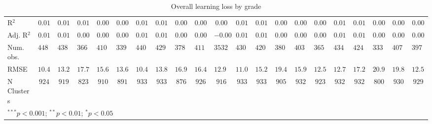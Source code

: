 \begin{table}
\begin{center}
\begin{tabular}{l c c c c c c c c c c c c c c c c c c c c}
\hline
R$^2$                     & $0.01$        & $0.01$        & $0.01$        & $0.00$        & $0.00$       & $0.01$        & $0.01$        & $0.00$        & $0.00$        & $0.00$       & $0.01$        & $0.01$        & $0.00$        & $0.00$        & $0.00$       & $0.01$        & $0.01$        & $0.00$        & $0.00$        & $0.00$       \\
Adj. R$^2$                & $0.01$        & $0.01$        & $0.00$        & $0.00$        & $0.00$       & $0.01$        & $0.01$        & $0.00$        & $0.00$        & $-0.00$      & $0.01$        & $0.01$        & $0.00$        & $0.00$        & $0.00$       & $0.01$        & $0.01$        & $0.00$        & $0.00$        & $0.00$       \\
Num. obs.                 & $44893$       & $43899$       & $36627$       & $41058$       & $33932$      & $44008$       & $42921$       & $37893$       & $41192$       & $35321$      & $43073$       & $42082$       & $38088$       & $40320$       & $36566$      & $43445$       & $42494$       & $33321$       & $40752$       & $39750$      \\
RMSE                      & $10.40$       & $13.25$       & $17.72$       & $15.61$       & $13.64$      & $10.41$       & $13.85$       & $16.93$       & $16.44$       & $12.92$      & $11.00$       & $15.23$       & $19.49$       & $15.91$       & $12.56$      & $12.77$       & $17.21$       & $20.95$       & $19.87$       & $12.58$      \\
N Clusters                & $924$         & $919$         & $823$         & $910$         & $891$        & $933$         & $933$         & $876$         & $926$         & $916$        & $933$         & $933$         & $905$         & $932$         & $923$        & $932$         & $932$         & $800$         & $930$         & $929$        \\
\hline
\multicolumn{21}{l}{\scriptsize{$^{***}p<0.001$; $^{**}p<0.01$; $^{*}p<0.05$}}
\end{tabular}
\caption{Overall learning loss by grade}
\label{table:grade}
\end{center}
\end{table}
